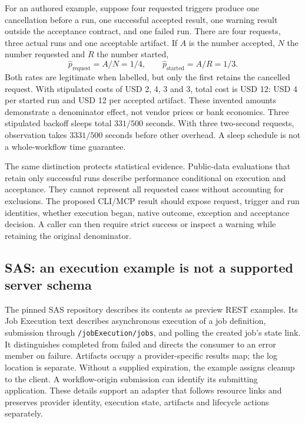 For an authored example, suppose four requested triggers produce one
cancellation before a run, one successful accepted result, one warning
result outside the acceptance contract, and one failed run. There are four
requests, three actual runs and one acceptable artifact. If $A$ is the
number accepted, $N$ the number requested and $R$ the number started,
\begin{equation}
  \widehat p_{\mathrm{request}}=A/N=1/4,
  \qquad \widehat p_{\mathrm{started}}=A/R=1/3.
  \label{eq:exec24-workflow-denominator}
\end{equation}
Both rates are legitimate when labelled, but only the first retains the
cancelled request. With stipulated costs of USD 2, 4, 3 and 3, total cost
is USD 12: USD 4 per started run and USD 12 per accepted artifact. These
invented amounts demonstrate a denominator effect, not vendor prices or
bank economics. Three stipulated backoff sleeps total $331/500$ seconds.
With three two-second requests, observation takes $3331/500$ seconds before
other overhead. A sleep schedule is not a whole-workflow time guarantee.
\citep{exec24_workflow_contracts_reference}

The same distinction protects statistical evidence. Public-data evaluations
that retain only successful runs describe performance conditional on
execution and acceptance. They cannot represent all requested cases without
accounting for exclusions. The proposed CLI/MCP result should expose request,
trigger and run identities, whether execution began, native outcome,
exception and acceptance decision. A caller can then require strict success
or inspect a warning while retaining the original denominator.

\subsection{SAS: an execution example is not a supported server schema}

The pinned SAS repository describes its contents as preview REST examples.
Its Job Execution text describes asynchronous execution of a job definition,
submission through \texttt{/jobExecution/jobs}, and polling the created
job's state link. It distinguishes completed from failed and directs the
consumer to an error member on failure. Artifacts occupy a provider-specific
results map; the log location is separate. Without a supplied expiration,
the example assigns cleanup to the client. A workflow-origin submission
can identify its submitting application. These details support an adapter
that follows resource links and preserves provider identity, execution
state, artifacts and lifecycle actions separately.
\citep{exec24_workflow_contracts_sas}

